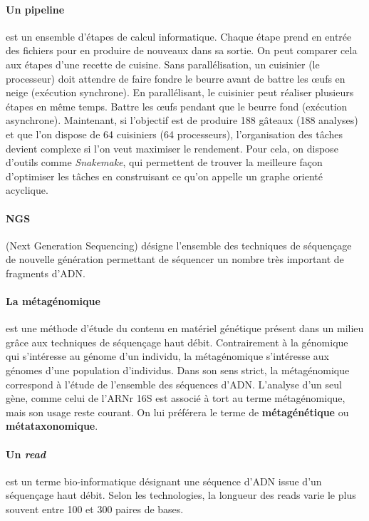 \documentclass[12pt,a4paper]{article}
\begin{document}
\paragraph{Un pipeline} est un ensemble d'étapes de calcul informatique. Chaque étape prend en entrée des fichiers pour en produire de nouveaux dans sa sortie. On peut comparer cela aux étapes d'une recette de cuisine. Sans parallélisation, un cuisinier (le processeur) doit attendre de faire fondre le beurre avant de battre les œufs en neige (exécution synchrone). En parallélisant, le cuisinier peut réaliser plusieurs étapes en même temps. Battre les œufs pendant que le beurre fond (exécution asynchrone).
Maintenant, si l'objectif est de produire 188 gâteaux (188 analyses) et que l'on dispose de 64 cuisiniers (64 processeurs), l'organisation des tâches devient complexe si l'on veut maximiser le rendement. Pour cela, on dispose d'outils comme \textit{Snakemake}\cite{Koster2012}, qui permettent de trouver la meilleure façon d'optimiser les tâches en construisant ce qu'on appelle un graphe orienté acyclique.

\paragraph{NGS}(Next Generation Sequencing) désigne l'ensemble des techniques de séquençage de nouvelle génération permettant de séquencer un nombre très important de fragments d'ADN.

\paragraph{La métagénomique} est une méthode d’étude du contenu en matériel génétique présent dans un milieu grâce aux techniques de séquençage haut débit. Contrairement à la génomique qui s’intéresse au génome d’un individu, la métagénomique s’intéresse aux génomes d’une population d’individus.
Dans son sens strict, la métagénomique correspond à l’étude de l’ensemble des séquences d'ADN. L’analyse d’un seul gène, comme celui de l’ARNr 16S est associé à tort au terme métagénomique, mais son usage reste courant. On lui préférera le terme de \textbf{métagénétique} ou \textbf{métataxonomique}.


\paragraph{Un \textit{read}} est un terme bio-informatique désignant une séquence d’ADN issue d’un séquençage haut débit. Selon les technologies, la longueur des reads varie le plus souvent entre 100 et 300 paires de bases.
\end{document}
